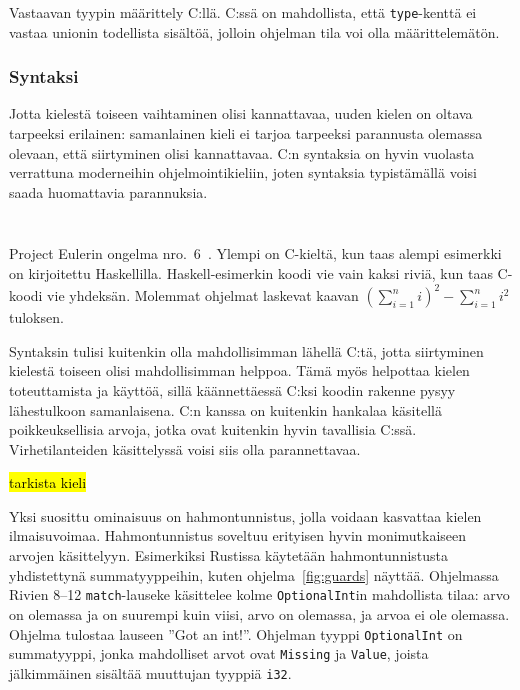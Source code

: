 \FloatBarrier

\begin{listing}[ht!]
    \inputminted{C}{sumtype.c}
    \caption{Vastaavan tyypin määrittely C:llä. C:ssä on mahdollista, että
    \texttt{type}-kenttä ei vastaa unionin todellista sisältöä, jolloin
    ohjelman tila voi olla määrittelemätön.}
    \label{fig:sumtypec}
\end{listing}

\FloatBarrier


\subsubsection{Syntaksi}

Jotta kielestä toiseen vaihtaminen olisi kannattavaa, uuden kielen on oltava
tarpeeksi erilainen: samanlainen kieli ei tarjoa tarpeeksi parannusta
olemassa olevaan, että siirtyminen olisi kannattavaa. C:n syntaksia on hyvin
vuolasta verrattuna moderneihin ohjelmointikieliin, joten syntaksia
typistämällä voisi saada huomattavia parannuksia.

\begin{listing}[ht!]
    \inputminted{C}{squaresum.c}
    \inputminted{Haskell}{squaresum.hs}
    \caption{Project Eulerin ongelma nro.\ 6~\citep{euler}. Ylempi on
    C-kieltä, kun taas alempi esimerkki on kirjoitettu Haskellilla.
    Haskell-esimerkin koodi vie vain kaksi riviä, kun taas C-koodi vie
    yhdeksän. Molemmat ohjelmat laskevat kaavan
    $(\sum\limits_{i=1}^n i)^2 - \sum\limits_{i=1}^n i^2$ tuloksen.
    }
    \label{fig:strcmp}
\end{listing}

\FloatBarrier

Syntaksin tulisi kuitenkin olla mahdollisimman lähellä C:tä, jotta siirtyminen
kielestä toiseen olisi mahdollisimman helppoa. Tämä myös helpottaa kielen
toteuttamista ja käyttöä, sillä käännettäessä C:ksi koodin rakenne pysyy
lähestulkoon samanlaisena. C:n kanssa on kuitenkin hankalaa käsitellä
poikkeuksellisia arvoja, jotka ovat kuitenkin hyvin tavallisia C:ssä.
Virhetilanteiden käsittelyssä voisi siis olla parannettavaa.

\newpage

\hl{tarkista kieli}

Yksi suosittu ominaisuus on hahmontunnistus, jolla
voidaan kasvattaa kielen ilmaisuvoimaa. Hahmontunnistus soveltuu erityisen
hyvin monimutkaiseen arvojen käsittelyyn. Esimerkiksi Rustissa käytetään
hahmontunnistusta yhdistettynä summatyyppeihin, kuten ohjelma~\ref{fig:guards}
näyttää. Ohjelmassa Rivien 8--12 \texttt{match}-lauseke käsittelee kolme
\texttt{OptionalInt}in mahdollista tilaa: arvo on olemassa ja on suurempi kuin
viisi, arvo on olemassa, ja arvoa ei ole olemassa. Ohjelma tulostaa lauseen
''Got an int!''. Ohjelman tyyppi \texttt{OptionalInt} on summatyyppi, jonka
mahdolliset arvot ovat \texttt{Missing} ja \texttt{Value}, joista jälkimmäinen
sisältää muuttujan tyyppiä \texttt{i32}.


